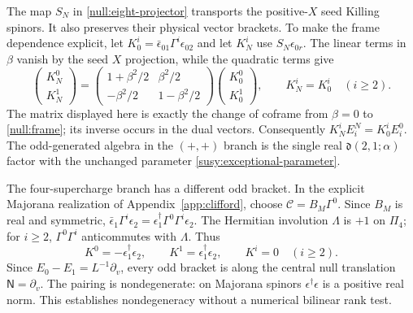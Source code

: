 The map $S_N$ in \eqref{null:eight-projector} transports the positive-$X$ seed Killing spinors. It also preserves their physical vector brackets. To make the frame dependence explicit, let $K_0^i=\bar\epsilon_{01}\Gamma^i\epsilon_{02}$ and let $K_N^i$ use $S_N\epsilon_{0r}$. The linear terms in $\beta$ vanish by the seed $X$ projection, while the quadratic terms give
\begin{equation}\label{null:vector-transport}
 \begin{pmatrix}K_N^0\\K_N^1\end{pmatrix}
 =\begin{pmatrix}1+\beta^2/2&\beta^2/2\\-\beta^2/2&1-\beta^2/2\end{pmatrix}
 \begin{pmatrix}K_0^0\\K_0^1\end{pmatrix},\qquad
 K_N^i=K_0^i\quad(i\ge2).
\end{equation}
The matrix displayed here is exactly the change of coframe from $\beta=0$ to \eqref{null:frame}; its inverse occurs in the dual vectors. Consequently $K_N^iE_i^N=K_0^iE_i^0$. The odd-generated algebra in the $(+,+)$ branch is the single real $\mathfrak d(2,1;\alpha)$ factor with the unchanged parameter \eqref{susy:exceptional-parameter}.

The four-supercharge branch has a different odd bracket. In the explicit Majorana realization of Appendix~\ref{app:clifford}, choose $\mathcal C=B_M\Gamma^0$. Since $B_M$ is real and symmetric, $\bar\epsilon_1\Gamma^i\epsilon_2=\epsilon_1^\dagger\Gamma^0\Gamma^i\epsilon_2$. The Hermitian involution $\Lambda$ is $+1$ on $\Pi_4$; for $i\ge2$, $\Gamma^0\Gamma^i$ anticommutes with $\Lambda$. Thus
\begin{equation}\label{null:four-bilinear}
 K^0=-\epsilon_1^\dagger\epsilon_2,
 \qquad K^1=\epsilon_1^\dagger\epsilon_2,
 \qquad K^i=0\quad(i\ge2).
\end{equation}
Since $E_0-E_1=L^{-1}\partial_v$, every odd bracket is along the central null translation $\mathsf N=\partial_v$. The pairing is nondegenerate: on Majorana spinors $\epsilon^\dagger\epsilon$ is a positive real norm. This establishes nondegeneracy without a numerical bilinear rank test.

